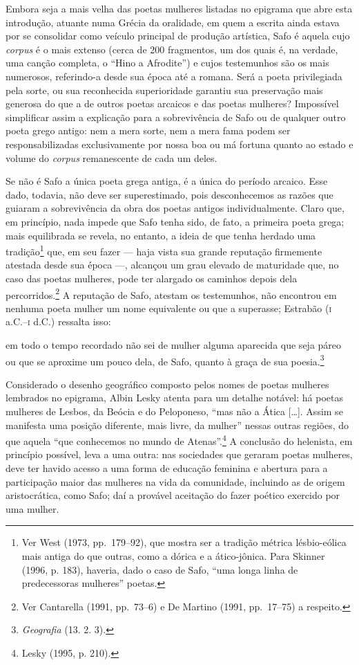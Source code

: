 Embora seja a mais velha das poetas mulheres listadas no epigrama que abre esta
introdução, atuante numa Grécia da oralidade, em quem a escrita ainda estava
por se consolidar como veículo principal de produção artística, Safo é aquela
cujo \textit{corpus} é o mais extenso (cerca de 200 fragmentos, um dos quais é,
na verdade, uma canção completa, o “Hino a Afrodite”) e cujos testemunhos são
os mais numerosos, referindo-a desde sua época até a romana. Será a poeta
privilegiada pela sorte, ou sua reconhecida superioridade garantiu sua
preservação mais generosa do que a de outros poetas arcaicos e das poetas
mulheres? Impossível simplificar assim a explicação
para a sobrevivência de Safo ou de qualquer outro poeta grego antigo: nem a
mera sorte, nem a mera fama podem ser responsabilizadas exclusivamente por
nossa boa ou má fortuna quanto ao estado e volume do \textit{corpus}
remanescente de cada um deles.

Se não é Safo a única poeta grega antiga, é a única do período
arcaico. Esse dado, todavia, não deve ser \mbox{superestimado,} pois desconhecemos as
razões que guiaram a sobrevivência da obra dos poetas antigos individualmente.
Claro que, em princípio, nada impede que Safo tenha sido, de fato, a primeira
poeta grega; mais equilibrada se revela, no entanto, a ideia de que tenha
herdado uma tradição\footnote{ Ver West (1973, pp.~179--92), que mostra ser a
tradição métrica lésbio-eólica mais antiga do que outras, como a dórica e a
ático-jônica. Para Skinner (1996, p. 183), haveria, dado o caso de Safo, “uma
longa linha de predecessoras mulheres” poetas.} que, em seu fazer --- haja vista
sua grande reputação firmemente atestada desde sua época ---, alcançou um grau
elevado de maturidade que, no caso das poetas mulheres, pode ter alargado os
caminhos depois dela percorridos.\footnote{ Ver Cantarella (1991, pp.~73--6) e De
Martino (1991, pp.~17--75) a respeito.} A reputação de Safo, atestam os
testemunhos, não encontrou em nenhuma poeta mulher um nome equivalente ou que a
superasse; Estrabão (\textsc{i} a.C.--\textsc{i} d.C.) ressalta isso: 

\begin{hedraquote}
em todo o tempo recordado não sei de mulher
alguma aparecida que seja páreo ou que se aproxime um pouco dela, de Safo,
quanto à graça de sua poesia.\footnote{ \textit{Geografia} (13. 2. 3).}
\end{hedraquote}

Considerado o desenho geográfico composto pelos nomes de poetas mulheres
lembrados no epigrama, Albin Lesky atenta para um detalhe
notável: há poetas mulheres de Lesbos, da Beócia e do Peloponeso, “mas não a
Ática [\ldots{}]. Assim se manifesta uma posição diferente, mais livre, da mulher”
nessas outras regiões, do que aquela “que conhecemos no mundo de Atenas”.\footnote{ Lesky (1995, p. 210).} A
conclusão do helenista, em princípio possível, leva a uma outra: nas sociedades
que geraram poetas mulheres, deve ter havido acesso a uma forma de educação
feminina e abertura para a participação maior das mulheres na vida da
comunidade, incluindo as de origem aristocrática, como Safo; daí a provável
aceitação do fazer poético exercido por uma mulher.


